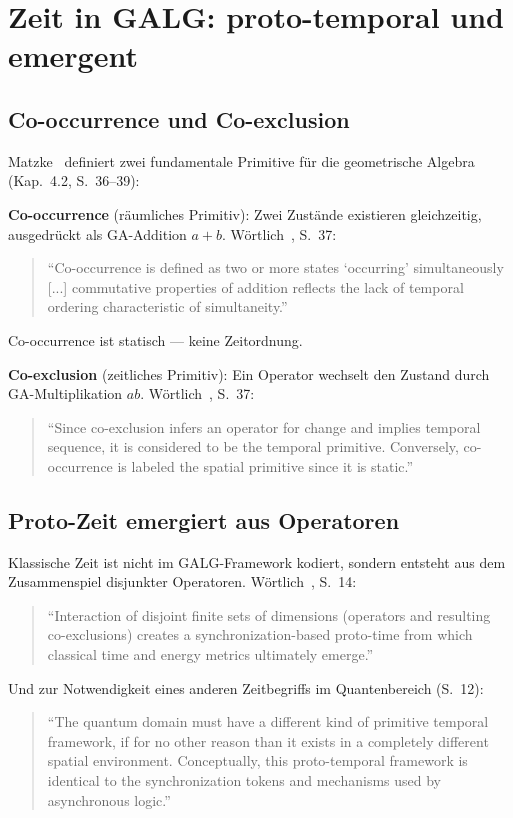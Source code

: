 \section{Zeit in GALG: proto-temporal und emergent}

\subsection{Co-occurrence und Co-exclusion}

Matzke~\cite{Matzke2002} definiert zwei fundamentale Primitive
für die geometrische Algebra (Kap.~4.2, S.~36--39):

\textbf{Co-occurrence} (räumliches Primitiv): Zwei Zustände
existieren gleichzeitig, ausgedrückt als GA-Addition $a+b$.
Wörtlich~\cite{Matzke2002}, S.~37:
\begin{quote}
``Co-occurrence is defined as two or more states `occurring'
simultaneously [...] commutative properties of addition reflects
the lack of temporal ordering characteristic of simultaneity.''
\end{quote}
Co-occurrence ist statisch --- keine Zeitordnung.

\textbf{Co-exclusion} (zeitliches Primitiv): Ein Operator
wechselt den Zustand durch GA-Multiplikation $ab$.
Wörtlich~\cite{Matzke2002}, S.~37:
\begin{quote}
``Since co-exclusion infers an operator for change and implies
temporal sequence, it is considered to be the temporal primitive.
Conversely, co-occurrence is labeled the spatial primitive
since it is static.''
\end{quote}

\subsection{Proto-Zeit emergiert aus Operatoren}

Klassische Zeit ist nicht im GALG-Framework kodiert,
sondern entsteht aus dem Zusammenspiel disjunkter Operatoren.
Wörtlich~\cite{Matzke2002}, S.~14:
\begin{quote}
``Interaction of disjoint finite sets of dimensions
(operators and resulting co-exclusions) creates a
synchronization-based proto-time from which classical time
and energy metrics ultimately emerge.''
\end{quote}

Und zur Notwendigkeit eines anderen Zeitbegriffs im Quantenbereich
(S.~12):
\begin{quote}
``The quantum domain must have a different kind of primitive
temporal framework, if for no other reason than it exists in
a completely different spatial environment. Conceptually, this
proto-temporal framework is identical to the synchronization
tokens and mechanisms used by asynchronous logic.''
\end{quote}

